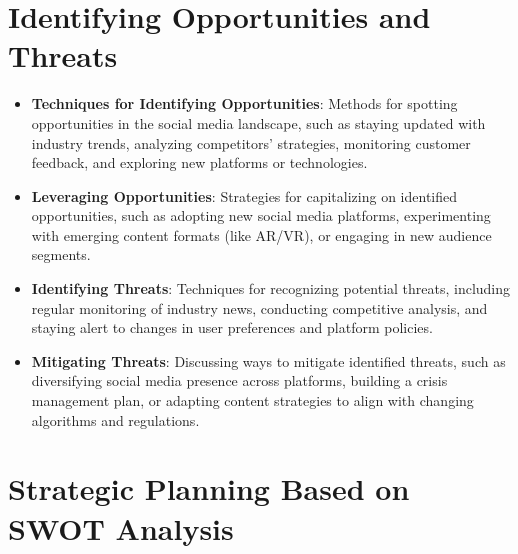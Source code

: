 \documentclass[
]{book}
\providecommand{\tightlist}{%
  \setlength{\itemsep}{0pt}\setlength{\parskip}{0pt}}
\begin{document}
\hypertarget{identifying-opportunities-and-threats}{%
\section*{Identifying Opportunities and Threats}\label{identifying-opportunities-and-threats}}

\begin{itemize}
\tightlist
\item
  \textbf{Techniques for Identifying Opportunities}: Methods for spotting opportunities in the social media landscape, such as staying updated with industry trends, analyzing competitors' strategies, monitoring customer feedback, and exploring new platforms or technologies.
\item
  \textbf{Leveraging Opportunities}: Strategies for capitalizing on identified opportunities, such as adopting new social media platforms, experimenting with emerging content formats (like AR/VR), or engaging in new audience segments.
\item
  \textbf{Identifying Threats}: Techniques for recognizing potential threats, including regular monitoring of industry news, conducting competitive analysis, and staying alert to changes in user preferences and platform policies.
\item
  \textbf{Mitigating Threats}: Discussing ways to mitigate identified threats, such as diversifying social media presence across platforms, building a crisis management plan, or adapting content strategies to align with changing algorithms and regulations.
\end{itemize}

\hypertarget{strategic-planning-based-on-swot-analysis}{%
\section*{Strategic Planning Based on SWOT Analysis}\label{strategic-planning-based-on-swot-analysis}}
\end{document}
